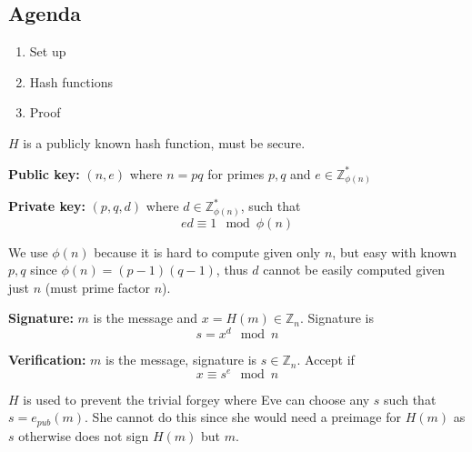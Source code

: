 

\subsection{Agenda}
\begin{enumerate}
\item Set up
\item Hash functions
\item Proof
\end{enumerate}

$H$ is a publicly known hash function, must be secure.

\textbf{Public key:} $(n, e)$ where $n = pq$ for primes $p, q$ and $e \in \mathbb{Z}_{\phi(n)}^*$

\textbf{Private key:} $(p, q, d)$ where $d \in \mathbb{Z}_{\phi(n)}^*$, such that
\[ ed \equiv 1 \mod \phi(n) \]

We use $\phi(n)$ because it is hard to compute given only $n$, but easy with known $p, q$ since $\phi(n) = (p-1)(q-1)$, thus $d$ cannot be easily computed given just $n$ (must prime factor $n$).

\textbf{Signature:} $m$ is the message and $x = H(m) \in \mathbb{Z}_n$. Signature is
\[ s = x^d \mod n \]

\textbf{Verification:} $m$ is the message, signature is $s \in \mathbb{Z}_n$. Accept if
\[ x \equiv s^e \mod n \]

$H$ is used to prevent the trivial forgey where Eve can choose any $s$ such that $s = e_{pub}(m)$. She cannot do this since she would need a preimage for $H(m)$ as $s$ otherwise does not sign $H(m)$ but $m$.

